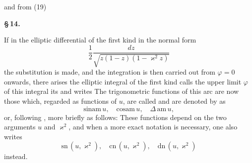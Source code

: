 

and from (19)


\begin{center}
\textbf{\S\,14. }
\end{center}

If in the elliptic differential of the first kind in the  normal form
\[
\frac{1}{2}\frac{dz}{\sqrt{z(1-z)(1-\varkappa^2 z)}}
\]
the substitution
is made, and the integration is then carried out from $\varphi = 0$ onwards, there arises the elliptic integral of the first kind
 calls the upper limit $\varphi$ of this integral its  and writes
The trigonometric functions of this arc
are now those which, regarded as functions of $u$, are called  and are denoted by  as
\[
\mathrm{sinam}\,u,\quad \mathrm{cosam}\,u,\quad \Delta\,\mathrm{am}\,u,
\]
or, following , more briefly as follows:
These functions depend on the two arguments $u$ and $\varkappa^2$, and when a more exact notation is necessary, one also writes
\[
\mathrm{sn}\,(u,\varkappa^2),\quad \mathrm{cn}\,(u,\varkappa^2),\quad \mathrm{dn}\,(u,\varkappa^2)
\]
instead.
